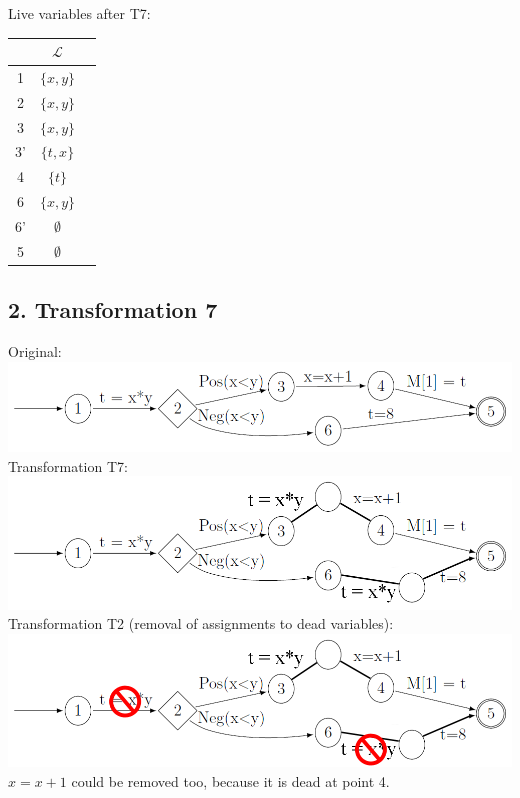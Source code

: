 \documentclass[11pt,a4paper]{scrartcl}
\begin{document}
Live variables after T7:\\
\begin{tabular}{|c|c|c|}
\hline
& $\mathcal{L}$\\
\hline
1 & $\{x, y\}$\\
2 & $\{x, y\}$\\
3 & $\{x, y\}$\\
3' & $\{t, x\}$\\
4 & $\{t\}$\\
6 & $\{x, y\}$\\
6' & $\emptyset$\\
5 & $\emptyset$ \\
\hline
\end{tabular}

\subsection*{2. Transformation 7}
Original:\\
\includegraphics[width=\linewidth]{1org}\\
Transformation T7:\\
\includegraphics[width=\linewidth]{1}
Transformation T2 (removal of assignments to dead variables):\\
\includegraphics[width=\linewidth]{1_2}
$x = x+1$ could be removed too, because it is dead at point 4.
\end{document}

